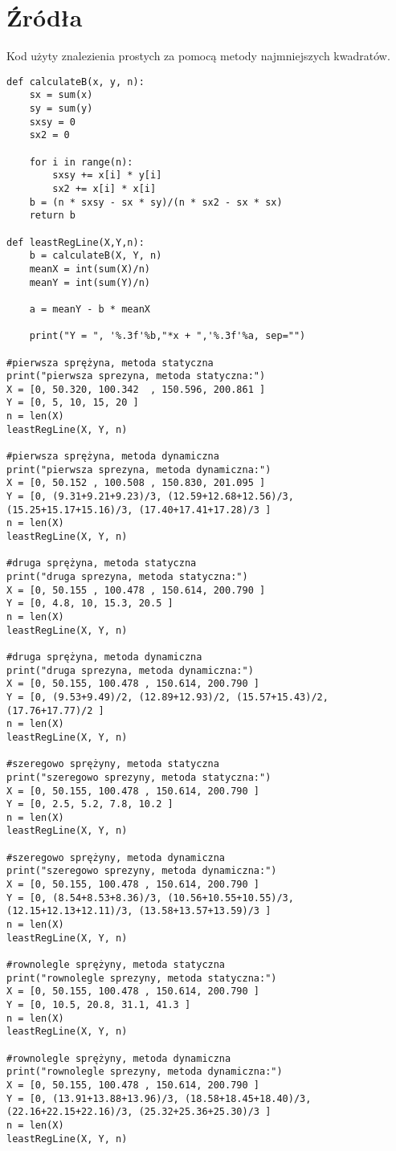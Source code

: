 \documentclass[11pt,a4paper]{article}
\begin{document}
    \section{Źródła}
    Kod użyty znalezienia prostych za pomocą metody najmniejszych kwadratów.
    \begin{verbatim}
def calculateB(x, y, n):
	sx = sum(x)
	sy = sum(y)
	sxsy = 0
	sx2 = 0

	for i in range(n):
		sxsy += x[i] * y[i]
		sx2 += x[i] * x[i]
	b = (n * sxsy - sx * sy)/(n * sx2 - sx * sx)
	return b

def leastRegLine(X,Y,n):
	b = calculateB(X, Y, n)
	meanX = int(sum(X)/n)
	meanY = int(sum(Y)/n)

	a = meanY - b * meanX

	print("Y = ", '%.3f'%b,"*x + ",'%.3f'%a, sep="")

#pierwsza sprężyna, metoda statyczna
print("pierwsza sprezyna, metoda statyczna:")
X = [0, 50.320, 100.342  , 150.596, 200.861 ]
Y = [0, 5, 10, 15, 20 ]
n = len(X)
leastRegLine(X, Y, n)

#pierwsza sprężyna, metoda dynamiczna
print("pierwsza sprezyna, metoda dynamiczna:")
X = [0, 50.152 , 100.508 , 150.830, 201.095 ]
Y = [0, (9.31+9.21+9.23)/3, (12.59+12.68+12.56)/3, (15.25+15.17+15.16)/3, (17.40+17.41+17.28)/3 ]
n = len(X)
leastRegLine(X, Y, n)

#druga sprężyna, metoda statyczna
print("druga sprezyna, metoda statyczna:")
X = [0, 50.155 , 100.478 , 150.614, 200.790 ]
Y = [0, 4.8, 10, 15.3, 20.5 ]
n = len(X)
leastRegLine(X, Y, n)

#druga sprężyna, metoda dynamiczna
print("druga sprezyna, metoda dynamiczna:")
X = [0, 50.155, 100.478 , 150.614, 200.790 ]
Y = [0, (9.53+9.49)/2, (12.89+12.93)/2, (15.57+15.43)/2, (17.76+17.77)/2 ]
n = len(X)
leastRegLine(X, Y, n)

#szeregowo sprężyny, metoda statyczna
print("szeregowo sprezyny, metoda statyczna:")
X = [0, 50.155, 100.478 , 150.614, 200.790 ]
Y = [0, 2.5, 5.2, 7.8, 10.2 ]
n = len(X)
leastRegLine(X, Y, n)

#szeregowo sprężyny, metoda dynamiczna
print("szeregowo sprezyny, metoda dynamiczna:")
X = [0, 50.155, 100.478 , 150.614, 200.790 ]
Y = [0, (8.54+8.53+8.36)/3, (10.56+10.55+10.55)/3, (12.15+12.13+12.11)/3, (13.58+13.57+13.59)/3 ]
n = len(X)
leastRegLine(X, Y, n)

#rownolegle sprężyny, metoda statyczna
print("rownolegle sprezyny, metoda statyczna:")
X = [0, 50.155, 100.478 , 150.614, 200.790 ]
Y = [0, 10.5, 20.8, 31.1, 41.3 ]
n = len(X)
leastRegLine(X, Y, n)

#rownolegle sprężyny, metoda dynamiczna
print("rownolegle sprezyny, metoda dynamiczna:")
X = [0, 50.155, 100.478 , 150.614, 200.790 ]
Y = [0, (13.91+13.88+13.96)/3, (18.58+18.45+18.40)/3, (22.16+22.15+22.16)/3, (25.32+25.36+25.30)/3 ]
n = len(X)
leastRegLine(X, Y, n)

    \end{verbatim}
\end{document}
